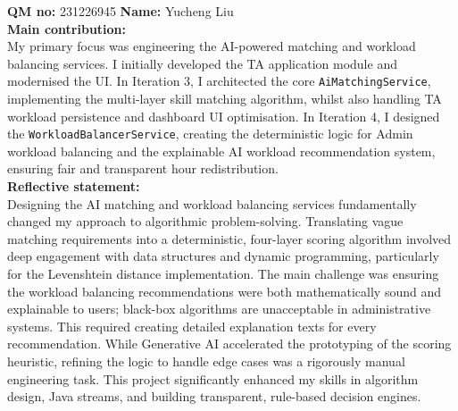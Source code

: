 \documentclass[12pt, a4paper]{article}
\begin{document}
\vspace{1.5em}
\textbf{QM no:} 231226945 \hspace{2em} \textbf{Name:} Yucheng Liu\\
\textbf{Main contribution:}\\
My primary focus was engineering the AI-powered matching and workload balancing services. I initially developed the TA application module and modernised the UI. In Iteration 3, I architected the core \texttt{AiMatchingService}, implementing the multi-layer skill matching algorithm, whilst also handling TA workload persistence and dashboard UI optimisation. In Iteration 4, I designed the \texttt{WorkloadBalancerService}, creating the deterministic logic for Admin workload balancing and the explainable AI workload recommendation system, ensuring fair and transparent hour redistribution.\\
\textbf{Reflective statement:}\\
Designing the AI matching and workload balancing services fundamentally changed my approach to algorithmic problem-solving. Translating vague matching requirements into a deterministic, four-layer scoring algorithm involved deep engagement with data structures and dynamic programming, particularly for the Levenshtein distance implementation. The main challenge was ensuring the workload balancing recommendations were both mathematically sound and explainable to users; black-box algorithms are unacceptable in administrative systems. This required creating detailed explanation texts for every recommendation. While Generative AI accelerated the prototyping of the scoring heuristic, refining the logic to handle edge cases was a rigorously manual engineering task. This project significantly enhanced my skills in algorithm design, Java streams, and building transparent, rule-based decision engines.
\end{document}
